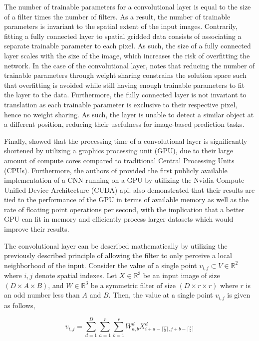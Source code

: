 \documentclass[../main/thesis.tex]{subfiles}
\begin{document}
The number of trainable parameters for a convolutional layer is equal to the size of a filter times the number of filters. As a result, the number of trainable parameters is invariant to the spatial extent of the input images. Contrarily, fitting a fully connected layer to spatial gridded data consists of associating a separate trainable parameter to each pixel. As such, the size of a fully connected layer scales with the size of the image, which increases the risk of overfitting the network. In the case of the convolutional layer, \citet{LeCun1989} notes that reducing the number of trainable parameters through weight sharing constrains the solution space such that overfitting is avoided while still having enough trainable parameters to fit the layer to the data. Furthermore, the fully connected layer is not invariant to translation as each trainable parameter is exclusive to their respective pixel, hence no weight sharing. As such, the layer is unable to detect a similar object at a different position, reducing their usefulness for image-based prediction tasks.

Finally, \citet{Ciresan2012} showed that the processing time of a convolutional layer is significantly shortened by utilizing a graphics processing unit (GPU), due to their large amount of compute cores compared to traditional Central Processing Units (CPUs). Furthermore, the authors of \citet{Krizhevsky2012} provided the first publicly available implementation of a CNN running on a GPU by utilizing the Nvidia Compute Unified Device Architecture (CUDA) api. \citet{Krizhevsky2012} also demonstrated that their results are tied to the performance of the GPU in terms of available memory as well as the rate of floating point operations per second, with the implication that a better GPU can fit in memory and efficiently process larger datasets which would improve their results.

The convolutional layer can be described mathematically by utilizing the previously described principle of allowing the filter to only perceive a local neighborhood of the input. Consider the value of a single point $v_{i,j} \subset V \in{\mathbb{R}^2}$ where $i,j$ denote spatial indexes. Let $X \in{\mathbb{R}^3}$ be an input image of size $(D \times A \times B)$, and $W \in{\mathbb{R}^3}$ be a symmetric filter of size $(D \times r \times r)$ where $r$ is an odd number less than $A$ and $B$. Then, the value at a single point $v_{i,j}$ is given as follows,

\begin{equation}
    \label{eq:singlepointconv}
    v_{i,j} = \sum_{d=1}^D \sum_{a=1}^r \sum_{b=1}^r W_{a, b}^d X_{i+a-\lceil \frac{r}{2} \rceil,j+b-\lceil \frac{r}{2} \rceil}^d
\end{equation}
\end{document}
